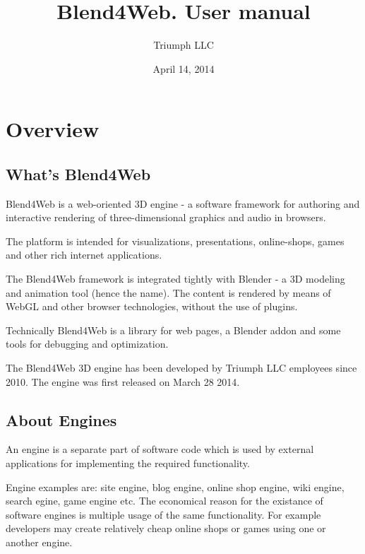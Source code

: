 \documentclass[a4paper,12pt,oneside]{sphinxmanual}
\title{Blend4Web. User manual}
\date{April 14, 2014}
\author{Triumph LLC}
\begin{document}
\maketitle
\tableofcontents
{}\label{index::doc}



\chapter{Overview}
\label{about:about}\label{about::doc}\label{about:id1}

\section{What's Blend4Web}
\label{about:about-product}\label{about:blend4web}\label{about:index-0}
Blend4Web is a web-oriented 3D engine - a software framework for authoring and interactive rendering of three-dimensional graphics and audio in browsers.

The platform is intended for visualizations, presentations, online-shops, games and other rich internet applications.

The Blend4Web framework is integrated tightly with Blender - a 3D modeling and animation tool (hence the name). The content is rendered by means of WebGL and other browser technologies, without the use of plugins.

Technically Blend4Web is a library for web pages, a Blender addon and some tools for debugging and optimization.

The Blend4Web 3D engine has been developed by Triumph LLC employees since 2010. The engine was first released on March 28 2014.


\section{About Engines}
\label{about:about-engine}\label{about:id2}\label{about:index-1}
An engine is a separate part of software code which is used by external applications for implementing the required functionality.

Engine examples are: site engine, blog engine, online shop engine, wiki engine, search egine, game engine etc. The economical reason for the existance of software engines is multiple usage of the same functionality. For example developers may create relatively cheap online shops or games using one or another engine.
\end{document}

